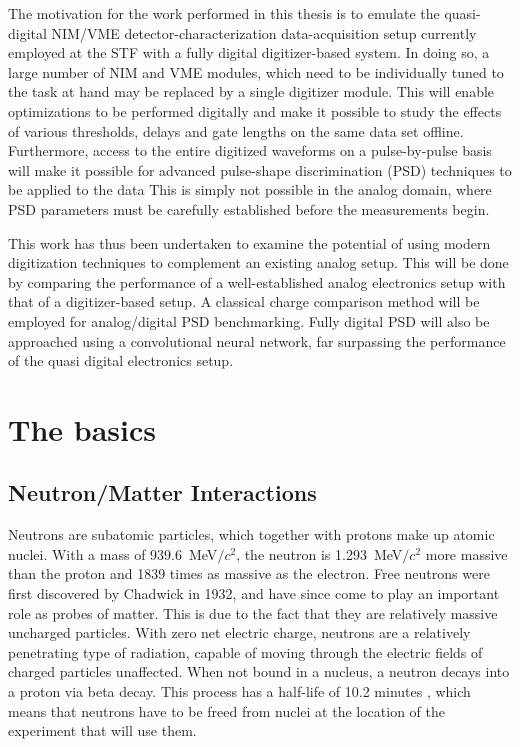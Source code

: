 \documentclass[main.tex]{subfiles}
\begin{document}
The motivation for the work performed in this thesis is to emulate the quasi-digital NIM/VME detector-characterization data-acquisition setup currently employed at the STF with a fully digital digitizer-based  system. In doing so, a large number of NIM and VME modules, which need to be individually tuned to the task at hand may be replaced by a single digitizer module. 
This will enable optimizations to be performed digitally and make it possible to study the effects of various thresholds, delays and gate lengths on the same data set offline. Furthermore, access to the entire digitized waveforms on a pulse-by-pulse basis will make it possible for advanced pulse-shape discrimination (PSD) techniques to be applied to the data This is simply not possible in the analog domain, where PSD parameters must be carefully established before the measurements begin.

This work has thus been undertaken to examine the potential of using modern digitization techniques to complement an existing analog setup. 
This will be done by comparing the performance of a well-established analog electronics setup with that of a digitizer-based setup. A classical charge comparison method will be employed for analog/digital PSD benchmarking.
Fully digital PSD will also be approached using a convolutional neural network, far surpassing the performance of the quasi digital electronics setup.

\section{The basics}
\subsection{Neutron/Matter Interactions}\label{sec:neutronMatterInteractions}
Neutrons are subatomic particles, which together with protons make up atomic nuclei. With a mass of \SI{939.6}{\MeV}$/c^\textrm{2}$, the neutron is \SI{1.293}{\MeV}$/c^\textrm{2}$ more massive than the proton and 1839 times as massive as the electron. 
Free neutrons were first discovered by Chadwick in 1932, and have since come to play an important role as probes of matter. This is due to the fact that they are relatively massive uncharged particles. With zero net electric charge, neutrons are a relatively penetrating type of radiation, capable of moving through the electric fields of charged particles unaffected. When not bound in a nucleus, a neutron decays into a proton via beta decay. This process has a half-life of 10.2 minutes \cite{Nudat}, which means that neutrons have to be freed from nuclei at the location of the experiment that will use them.
\end{document}
